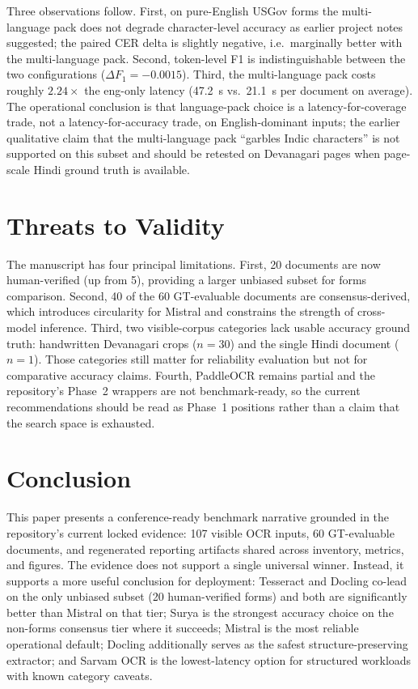 \documentclass[conference]{IEEEtran}
\begin{document}
Three observations follow. First, on pure-English USGov forms the multi-language pack does not degrade character-level accuracy as earlier project notes suggested; the paired CER delta is slightly negative, i.e.\ marginally better with the multi-language pack. Second, token-level F1 is indistinguishable between the two configurations ($\Delta F_1 = -0.0015$). Third, the multi-language pack costs roughly $2.24\times$ the eng-only latency (47.2~s vs.\ 21.1~s per document on average). The operational conclusion is that language-pack choice is a latency-for-coverage trade, not a latency-for-accuracy trade, on English-dominant inputs; the earlier qualitative claim that the multi-language pack ``garbles Indic characters'' is not supported on this subset and should be retested on Devanagari pages when page-scale Hindi ground truth is available.

\section{Threats to Validity}

The manuscript has four principal limitations. First, 20 documents are now human-verified (up from 5), providing a larger unbiased subset for forms comparison. Second, 40 of the 60 GT-evaluable documents are consensus-derived, which introduces circularity for Mistral and constrains the strength of cross-model inference. Third, two visible-corpus categories lack usable accuracy ground truth: handwritten Devanagari crops ($n=30$) and the single Hindi document ($n=1$). Those categories still matter for reliability evaluation but not for comparative accuracy claims. Fourth, PaddleOCR remains partial and the repository's Phase~2 wrappers are not benchmark-ready, so the current recommendations should be read as Phase~1 positions rather than a claim that the search space is exhausted.

\section{Conclusion}

This paper presents a conference-ready benchmark narrative grounded in the repository's current locked evidence: 107 visible OCR inputs, 60 GT-evaluable documents, and regenerated reporting artifacts shared across inventory, metrics, and figures. The evidence does not support a single universal winner. Instead, it supports a more useful conclusion for deployment: Tesseract and Docling co-lead on the only unbiased subset (20 human-verified forms) and both are significantly better than Mistral on that tier; Surya is the strongest accuracy choice on the non-forms consensus tier where it succeeds; Mistral is the most reliable operational default; Docling additionally serves as the safest structure-preserving extractor; and Sarvam OCR is the lowest-latency option for structured workloads with known category caveats.
\end{document}
